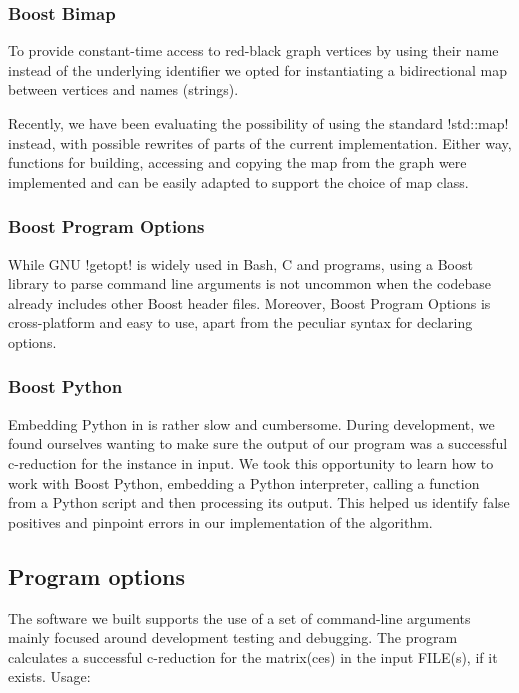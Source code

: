 \subsubsection*{Boost Bimap}

To provide constant-time access to red-black graph vertices by using their name instead of the underlying identifier we opted for instantiating a bidirectional map between vertices and names (strings).

Recently, we have been evaluating the possibility of using the standard !std::map! instead, with possible rewrites of parts of the current implementation.
Either way, functions for building, accessing and copying the map from the graph were implemented and can be easily adapted to support the choice of map class.

\subsubsection*{Boost Program Options}

While GNU !getopt! is widely used in Bash, C and \cc{} programs, using a Boost library to parse command line arguments is not uncommon when the codebase already includes other Boost header files.
Moreover, Boost Program Options is cross-platform and easy to use, apart from the peculiar syntax for declaring options.

\subsubsection*{Boost Python}

Embedding Python in \cc{} is rather slow and cumbersome.
During development, we found ourselves wanting to make sure the output of our program was a successful c-reduction for the instance in input.
We took this opportunity to learn how to work with Boost Python, embedding a Python interpreter, calling a function from a Python script and then processing its output.
This helped us identify false positives and pinpoint errors in our implementation of the algorithm.

\subsection{Program options}\label{section:program-options}

The software we built supports the use of a set of command-line arguments mainly focused around development testing and debugging.
The program calculates a successful c-reduction for the matrix(ces) in the input FILE(s), if it exists.
Usage:

